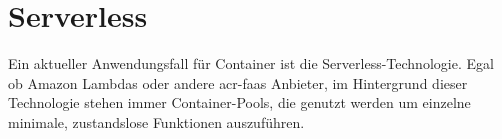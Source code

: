 \section{Serverless}
\label{sec:aktuellesServerless}

Ein aktueller Anwendungsfall für Container ist die Serverless-Technologie. Egal ob Amazon Lambdas oder andere \gls{acr-faas} Anbieter, im Hintergrund dieser Technologie stehen immer Container-Pools, die genutzt werden um einzelne minimale, zustandslose Funktionen auszuführen.

